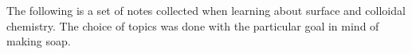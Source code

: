 The following is a set of notes collected when learning about surface and colloidal chemistry. The choice of topics was done with the particular goal in mind of making soap.
